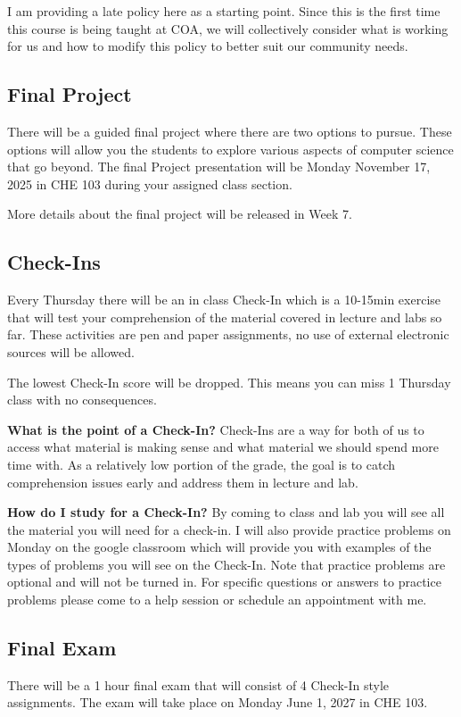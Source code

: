 \documentclass[12pt]{article}
\begin{document}
I am providing a late policy here as a starting point. 
Since this is the first time this course is being taught at COA, we will collectively consider what is working for us and how to modify this policy to better suit our community needs. 

\subsection{Final Project}
There will be a guided final project where there are two options to pursue.
These options will allow you the students to explore various aspects of computer science that go beyond.
The final Project presentation will be Monday November 17, 2025 in CHE 103 during your assigned class section. 

More details about the final project will be released in Week 7. 

\subsection{Check-Ins}
Every Thursday there will be an in class Check-In which is a 10-15min exercise that will test your comprehension of the material covered in lecture and labs so far.
These activities are pen and paper assignments, no use of external electronic sources will be allowed.

The lowest Check-In score will be dropped.
This means you can miss 1 Thursday class with no consequences. 

\textbf{What is the point of a Check-In?}
Check-Ins are a way for both of us to access what material is making sense and what material we should spend more time with.
As a relatively low portion of the grade, the goal is to catch comprehension issues early and address them in lecture and lab.

\textbf{How do I study for a Check-In?}
By coming to class and lab you will see all the material you will need for a check-in.
I will also provide practice problems on Monday on the google classroom which will provide you with examples of the types of problems you will see on the Check-In.
Note that practice problems are optional and will not be turned in.
For specific questions or answers to practice problems please come to a help session or schedule an appointment with me. 

\subsection{Final Exam}
There will be a 1 hour final exam that will consist of 4 Check-In style assignments.
The exam will take place on Monday June 1, 2027 in CHE 103. 
\end{document}

